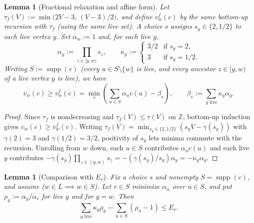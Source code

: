 \documentclass[11pt]{article}
\newtheorem{lemma}[theorem]{Lemma}
\DeclareMathOperator{\supp}{supp}
\begin{document}
\begin{lemma}[Fractional relaxation and affine form]\label{lem:CD}
Let $\tau_f(V) := \min\bigl(2V - 3,\, (V - 3)/2\bigr)$, and define $v_w^f(c)$ by the same bottom-up recursion with $\tau_f$ (using the same live set). A \emph{choice} $s$ assigns $s_y \in \{2, 1/2\}$ to each live vertex $y$. Set $\alpha_w := 1$ and, for each live $y$,
\[
\alpha_y := \prod_{z \in [y, w)} s_z, \qquad
\kappa_y := \begin{cases} 3/2 & \text{if } s_y = 2, \\ 3 & \text{if } s_y = 1/2. \end{cases}
\]
Writing $S := \supp(c)$ (every $u \in S \setminus \{w\}$ is live, and every ancestor $z \in [y,w)$ of a live vertex $y$ is live), we have
\[
v_w(c) \ge v_w^f(c) = \min_s \left( \sum_{u \in S} \alpha_u c(u) - \beta_s \right), \qquad \beta_s := \sum_{y \text{ live}} \kappa_y \alpha_y.
\]
\end{lemma}

\begin{proof}
Since $\tau_f$ is nondecreasing and $\tau_f(V) \le \tau(V)$ on $\mathbb{Z}$, bottom-up induction gives $v_w(c) \ge v_w^f(c)$. Writing $\tau_f(V) = \min_{s_y \in \{2, 1/2\}} (s_y V - \gamma(s_y))$ with $\gamma(2) = 3$ and $\gamma(1/2) = 3/2$, positivity of $s_y$ lets minima commute with the recursion. Unrolling from $w$ down, each $u \in S$ contributes $\alpha_u c(u)$ and each live $y$ contributes $-\gamma(s_y) \prod_{z \in (y,w)} s_z = -(\gamma(s_y)/s_y)\alpha_y = -\kappa_y \alpha_y$.
\end{proof}

\begin{lemma}[Comparison with $E_r$]\label{lem:E}
Fix a choice $s$ and nonempty $S = \supp(c)$, and assume ($w \in L \implies w \in S$). Let $r \in S$ minimize $\alpha_u$ over $u \in S$, and put $\rho_y := \alpha_y / \alpha_r$ for live $y$ and for $y = w$. Then
\[
\sum_{y \text{ live}} \kappa_y \rho_y - \sum_{u \in S} (\rho_u - 1) \le E_r.
\]
\end{lemma}
\end{document}
